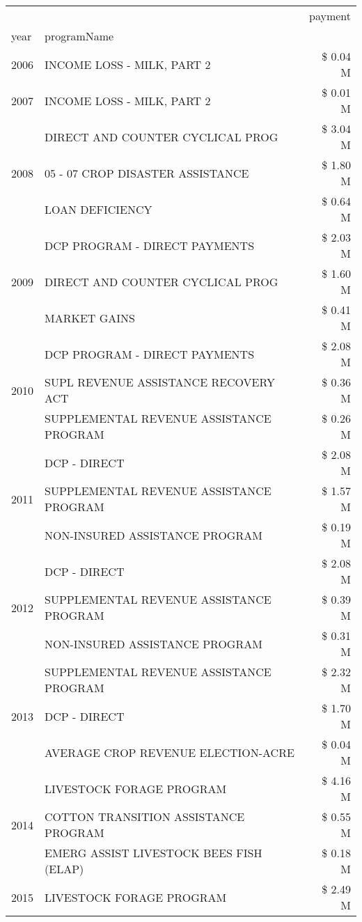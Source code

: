 \begin{tabular}{llr}
\toprule
 &  & payment \\
year & programName &  \\
\midrule
2006 & INCOME LOSS - MILK, PART 2 & \$ 0.04 M \\
\cline{1-3}
2007 & INCOME LOSS - MILK, PART 2 & \$ 0.01 M \\
\cline{1-3}
\multirow[t]{3}{*}{2008} & DIRECT AND COUNTER CYCLICAL PROG & \$ 3.04 M \\
 & 05 - 07 CROP DISASTER ASSISTANCE & \$ 1.80 M \\
 & LOAN DEFICIENCY & \$ 0.64 M \\
\cline{1-3}
\multirow[t]{3}{*}{2009} & DCP PROGRAM - DIRECT PAYMENTS & \$ 2.03 M \\
 & DIRECT AND COUNTER CYCLICAL PROG & \$ 1.60 M \\
 & MARKET GAINS & \$ 0.41 M \\
\cline{1-3}
\multirow[t]{3}{*}{2010} & DCP PROGRAM - DIRECT PAYMENTS & \$ 2.08 M \\
 & SUPL REVENUE ASSISTANCE RECOVERY ACT & \$ 0.36 M \\
 & SUPPLEMENTAL REVENUE ASSISTANCE PROGRAM & \$ 0.26 M \\
\cline{1-3}
\multirow[t]{3}{*}{2011} & DCP - DIRECT & \$ 2.08 M \\
 & SUPPLEMENTAL REVENUE ASSISTANCE PROGRAM & \$ 1.57 M \\
 & NON-INSURED ASSISTANCE PROGRAM & \$ 0.19 M \\
\cline{1-3}
\multirow[t]{3}{*}{2012} & DCP - DIRECT & \$ 2.08 M \\
 & SUPPLEMENTAL REVENUE ASSISTANCE PROGRAM & \$ 0.39 M \\
 & NON-INSURED ASSISTANCE PROGRAM & \$ 0.31 M \\
\cline{1-3}
\multirow[t]{3}{*}{2013} & SUPPLEMENTAL REVENUE ASSISTANCE PROGRAM & \$ 2.32 M \\
 & DCP - DIRECT & \$ 1.70 M \\
 & AVERAGE CROP REVENUE ELECTION-ACRE & \$ 0.04 M \\
\cline{1-3}
\multirow[t]{3}{*}{2014} & LIVESTOCK FORAGE PROGRAM & \$ 4.16 M \\
 & COTTON TRANSITION ASSISTANCE PROGRAM & \$ 0.55 M \\
 & EMERG ASSIST LIVESTOCK BEES FISH (ELAP) & \$ 0.18 M \\
\cline{1-3}
\multirow[t]{3}{*}{2015} & LIVESTOCK FORAGE PROGRAM & \$ 2.49 M \\

\end{tabular}
